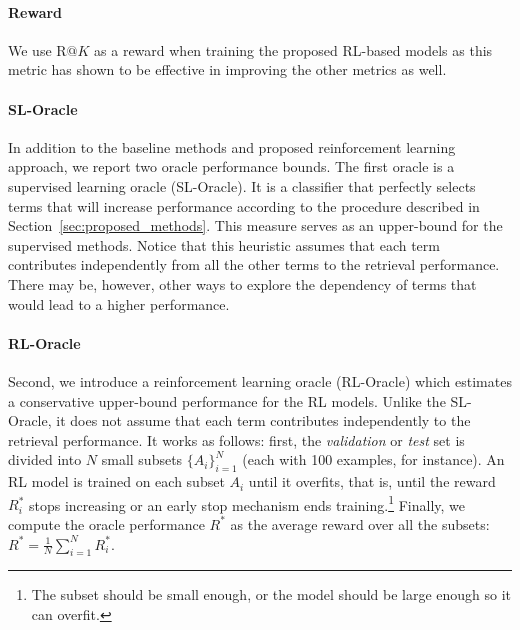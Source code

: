 \documentclass[11pt,letterpaper]{article}
\newcommand{\todo}[1]{{\Large\textcolor{red}{#1}}}
\begin{document}

\paragraph{Reward}
We use $\text{R}@K$ as a reward when training the proposed RL-based models as this metric has shown to be effective in improving the other metrics as well.

\paragraph{SL-Oracle}
In addition to the baseline methods and proposed reinforcement learning approach, we report two oracle performance bounds. The first oracle is a supervised learning oracle (SL-Oracle). It is a classifier that perfectly selects terms that will increase performance according to the procedure described in Section~\ref{sec:proposed_methods}. This measure serves as an upper-bound for the supervised methods. Notice that this heuristic assumes that each term contributes independently from all the other terms to the retrieval performance. There may be, however, other ways to explore the dependency of terms that would lead to a higher performance.

\paragraph{RL-Oracle}
Second, we introduce a reinforcement learning oracle (RL-Oracle) which estimates a conservative upper-bound performance for the RL models. Unlike the SL-Oracle, it does not assume that each term contributes independently to the retrieval performance. It works as follows: first, the \textit{validation} or \textit{test} set is divided into $N$ small subsets $\{A_i\}_{i=1}^N$ (each with 100 examples, for instance).
An RL model is trained on each subset $A_i$ until it overfits, that is, until the reward $R_i^*$ stops increasing or an early stop mechanism ends training.\footnote{The subset should be small enough, or the model should be large enough so it can overfit.} Finally, we compute the oracle performance $R^*$ as the average reward over all the subsets: $R^*= \frac{1}{N}\sum_{i=1}^{N} R_i^*$.
\end{document}
